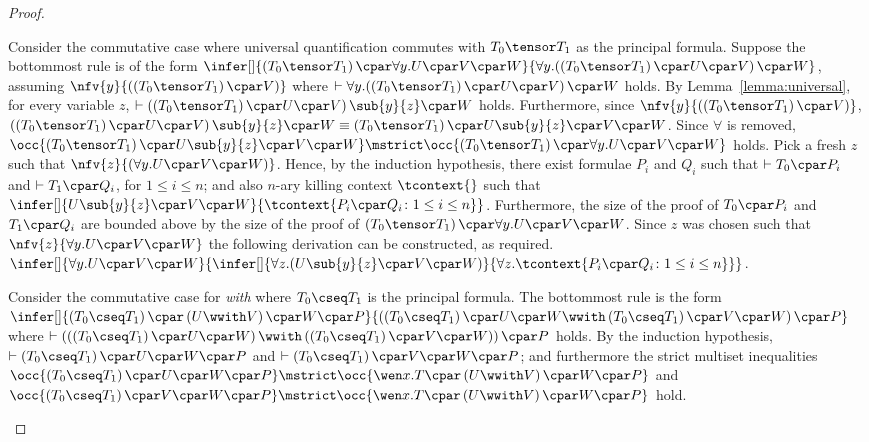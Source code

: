 \begin{proof}
\begin{enumerate}[label=\textbf{\Alph*},ref=\Alph*,leftmargin=*]
{Consider the commutative case where universal quantification commutes with $T_0 \tensor T_1$  as the principal formula. Suppose the bottommost rule is of the form
$
\infer[]{
\left(T_0 \tensor T_1\right) \cpar \forall y. U \cpar V \cpar W
}{
\mathopen{\forall y.}\left( \left(T_0 \tensor T_1\right) \cpar U \cpar V \right) \cpar W
}$, 
assuming $\nfv{y}{(\left(T_0 \tensor T_1\right) \cpar V)}$
where $\vdash \mathopen{\forall y.}\left( \left(T_0 \tensor T_1\right) \cpar U \cpar V \right) \cpar W$ holds.
By Lemma~\ref{lemma:universal}, for every variable $z$, $\vdash \left( \left(T_0 \tensor T_1\right) \cpar U \cpar V \right)\sub{y}{z} \cpar W$ holds.
Furthermore, since $\nfv{y}{(\left(T_0 \tensor T_1\right) \cpar V)}$, $\left( \left(T_0 \tensor T_1\right) \cpar U \cpar V \right)\sub{y}{z} \cpar W \equiv \left(T_0 \tensor T_1\right) \cpar U\sub{y}{z} \cpar V \cpar W$.
Since $\forall$ is removed, $
\occ{ \left(T_0 \tensor T_1\right) \cpar U\sub{y}{z} \cpar V \cpar W } \mstrict \occ{ \left(T_0 \tensor T_1\right) \cpar \forall y. U \cpar V \cpar W }
$ holds.
Pick a fresh $z$ such that $\nfv{z}{(\forall y. U \cpar V \cpar W)}$.
Hence, by the induction hypothesis, there exist formulae $P_i$ and $Q_i$ such that $\vdash T_0 \cpar P_i$ and $\vdash T_1 \cpar Q_i$, for $1 \leq i \leq n$; and also $n$-ary killing context $\tcontext{}$ such that
$
\infer[]{
U\sub{y}{z} \cpar V \cpar W
}{
\tcontext{ P_i \cpar Q_i \colon 1 \leq i \leq n }
}
$.
Furthermore, the size of the proof of $T_0 \cpar P_i$ and $T_1 \cpar Q_i$ are bounded above by the size of the proof of $\left(T_0 \tensor T_1\right) \cpar \forall y. U \cpar V \cpar W$.
Since $z$ was chosen such that $\nfv{z}{ \forall y. U \cpar V \cpar W }$ the following derivation can be constructed, as required.
$
\infer[]{
\forall y. U \cpar V \cpar W
}{
\infer[]{
\mathopen{\forall z.} \left( U\sub{y}{z} \cpar V \cpar W \right) 
}{
\mathopen{\forall z.} \tcontext{ P_i \cpar Q_i \colon 1 \leq i \leq n }
}}
$.
\smallskip


Consider the commutative case for \textit{with} where $T_0 \cseq T_1$ is the principal formula. The bottommost rule is the form
$
\infer[]{
\left(T_0 \cseq T_1\right) \cpar \left( U \wwith V \right) \cpar W \cpar P
}{
\left(\left(T_0 \cseq T_1\right) \cpar U \cpar W \wwith
\left(T_0 \cseq T_1\right) \cpar V \cpar W\right)
\cpar P
}
$
where $\vdash \left(\left(\left(T_0 \cseq T_1\right) \cpar U \cpar W\right) \wwith \left(\left(T_0 \cseq T_1\right) \cpar V \cpar W\right)\right) \cpar P$ holds.
By the induction hypothesis, $\vdash \left(T_0 \cseq T_1\right) \cpar U \cpar W \cpar P$ and $\vdash \left(T_0 \cseq T_1\right) \cpar V \cpar W \cpar P$; and furthermore the strict multiset inequalities
$\occ{\left(T_0 \cseq T_1\right) \cpar U \cpar W \cpar P} \mstrict \occ{ \wen x. T \cpar \left( U \wwith V \right) \cpar W \cpar P }$
and
$\occ{\left(T_0 \cseq T_1\right) \cpar V \cpar W \cpar P} \mstrict \occ{ \wen x. T \cpar \left( U \wwith V \right) \cpar W \cpar P }$ hold.

}
\end{enumerate}
\end{proof}
